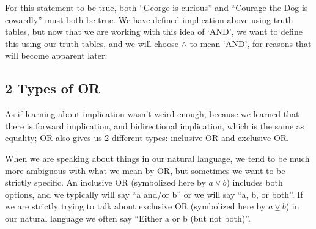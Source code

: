 For this statement to be true, both ``George is curious'' and ``Courage the Dog is cowardly'' must both be true. We have defined implication above using truth tables, but now that we are working with this idea of `AND', we want to define this using our truth tables, and we will choose $\wedge$ to mean `AND', for reasons that will become apparent later:

\begin{table}[ht]
\centering
{}
\quad
{}
\caption{Tables for Describing the Boolean Logic AND Operator}
\end{table}

\subsection{2 Types of OR}
As if learning about implication wasn't weird enough, because we learned that there is forward implication, and bidirectional implication, which is the same as equality; OR also gives us 2 different types: inclusive OR and exclusive OR.

When we are speaking about things in our natural language, we tend to be much more ambiguous with what we mean by OR, but sometimes we want to be strictly specific. An inclusive OR (symbolized here by $a \vee b$) includes both options, and we typically will say ``a and/or b'' or we will say ``a, b, or both''. If we are strictly trying to talk about exclusive OR (symbolized here by $a \veebar b$) in our natural language we often say ``Either a or b (but not both)''.

